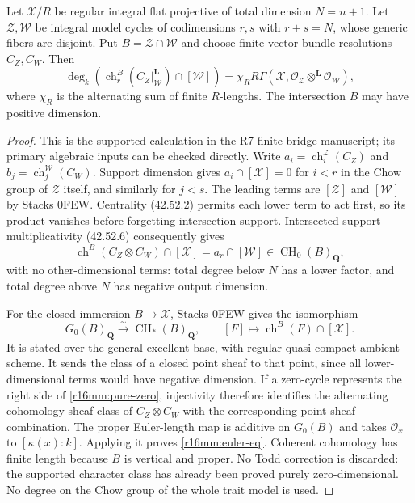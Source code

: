 \begin{lemma}
\label{r16mm:euler}
Let $\mathcal X/R$ be regular integral flat projective of total
dimension $N=n+1$. Let $\mathcal Z,\mathcal W$ be integral
model cycles of codimensions $r,s$ with $r+s=N$, whose generic
fibers are disjoint. Put $B=\mathcal Z\cap\mathcal W$ and
choose finite vector-bundle resolutions $C_Z,C_W$. Then
\[
 \deg_k\left(\operatorname{ch}_r^B
          (C_Z|^{\mathbf L}_{\mathcal W})\cap[\mathcal W]\right)
 =\chi_R R\Gamma\left(\mathcal X,
         \mathcal O_{\mathcal Z}\otimes^{\mathbf L}
                                   \mathcal O_{\mathcal W}\right),
 \tag{MM16.7}\label{r16mm:euler-eq}
\]
where $\chi_R$ is the alternating sum of finite $R$-lengths.
The intersection $B$ may have positive dimension.
\end{lemma}

\begin{proof}
This is the supported calculation in the R7 finite-bridge
manuscript; its primary algebraic inputs can be checked directly.
Write $a_i=\operatorname{ch}_i^{\mathcal Z}(C_Z)$ and
$b_j=\operatorname{ch}_j^{\mathcal W}(C_W)$.
Support dimension gives $a_i\cap[\mathcal X]=0$ for $i<r$
in the Chow group of $\mathcal Z$ itself, and similarly for
$j<s$. The leading terms are $[\mathcal Z]$ and
$[\mathcal W]$ by Stacks 0FEW. Centrality (42.52.2) permits
each lower term to act first, so its product vanishes before
forgetting intersection support. Intersected-support
multiplicativity (42.52.6) consequently gives
\[
 \operatorname{ch}^B(C_Z\otimes C_W)\cap[\mathcal X]
  =a_r\cap[\mathcal W]\in\operatorname{CH}_0(B)_{\mathbf Q},
 \tag{MM16.8}\label{r16mm:pure-zero}
\]
with no other-dimensional terms: total degree below $N$ has
a lower factor, and total degree above $N$ has negative output
dimension.

For the closed immersion $B\to\mathcal X$, Stacks 0FEW gives
the isomorphism
\[
 G_0(B)_{\mathbf Q}\xrightarrow{\sim}\operatorname{CH}_*(B)_{\mathbf Q},
 \qquad [F]\longmapsto
           \operatorname{ch}^B(F)\cap[\mathcal X].
\]
It is stated over the general excellent base, with regular
quasi-compact ambient scheme. It sends the class of a closed
point sheaf to that point, since all lower-dimensional terms
would have negative dimension. If a zero-cycle represents the
right side of \eqref{r16mm:pure-zero}, injectivity therefore
identifies the alternating cohomology-sheaf class of
$C_Z\otimes C_W$ with the corresponding point-sheaf combination.
The proper Euler-length map is additive on $G_0(B)$ and takes
$\mathcal O_x$ to $[\kappa(x):k]$. Applying it proves
\eqref{r16mm:euler-eq}. Coherent cohomology has finite length
because $B$ is vertical and proper. No Todd correction is
discarded: the supported character class has already been
proved purely zero-dimensional. No degree on the Chow group of
the whole trait model is used.
\end{proof}

